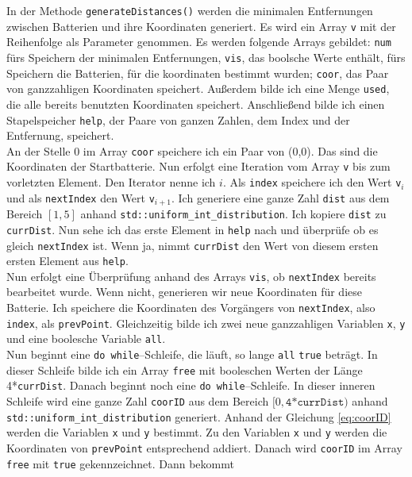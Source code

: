 \documentclass[a4paper,10pt,ngerman]{scrartcl}
\begin{document}
In der Methode \texttt{generateDistances()} werden die minimalen Entfernungen zwischen Batterien und ihre Koordinaten generiert.
Es wird ein Array \texttt{v} mit der Reihenfolge als Parameter genommen.
Es werden folgende Arrays gebildet: \texttt{num} fürs Speichern der minimalen Entfernungen, \texttt{vis}, das boolsche Werte
enthält, fürs Speichern die Batterien, für die koordinaten bestimmt wurden; \texttt{coor}, das Paar von
ganzzahligen Koordinaten speichert.
Außerdem bilde ich eine Menge \texttt{used}, die alle bereits benutzten Koordinaten speichert.
Anschließend bilde ich einen Stapelspeicher \texttt{help}, der Paare von ganzen Zahlen, dem Index und der Entfernung, speichert.\\
An der Stelle 0 im Array \texttt{coor} speichere ich ein Paar von (0,0). Das sind die Koordinaten der Startbatterie.
Nun erfolgt eine Iteration vom Array \texttt{v} bis zum vorletzten Element. Den Iterator nenne ich $i$.
Als \texttt{index} speichere ich den Wert \texttt{v}$_i$ und als \texttt{nextIndex} den Wert \texttt{v}$_{i+1}$.
Ich generiere eine ganze Zahl \texttt{dist} aus dem Bereich $[1,5]$ anhand \texttt{std::uniform\_int\_distribution}.
Ich kopiere \texttt{dist} zu \texttt{currDist}. Nun sehe ich das erste Element in \texttt{help} nach und überprüfe
ob es gleich \texttt{nextIndex} ist. Wenn ja, nimmt \texttt{currDist} den Wert von diesem ersten ersten Element aus \texttt{help}.\\
Nun erfolgt eine Überprüfung anhand des Arrays \texttt{vis}, ob \texttt{nextIndex} bereits bearbeitet wurde.
Wenn nicht, generieren wir neue Koordinaten für diese Batterie.
Ich speichere die Koordinaten des Vorgängers von \texttt{nextIndex}, also \texttt{index}, als \texttt{prevPoint}.
Gleichzeitig bilde ich zwei neue ganzzahligen Variablen
\texttt{x}, \texttt{y} und eine boolesche Variable \texttt{all}.\\
Nun beginnt eine \texttt{do while}--Schleife, die läuft, so lange \texttt{all} \texttt{true} beträgt.
In dieser Schleife bilde ich ein Array \texttt{free} mit booleschen Werten der Länge 4*\texttt{currDist}.
Danach beginnt noch eine \texttt{do while}--Schleife. In dieser inneren Schleife wird
eine ganze Zahl \texttt{coorID} aus dem Bereich $[0, \texttt{4*currDist})$ anhand \texttt{std::uniform\_int\_distribution} generiert.
Anhand der Gleichung \ref{eq:coorID} werden die Variablen \texttt{x} und \texttt{y} bestimmt.
Zu den Variablen \texttt{x} und \texttt{y} werden die Koordinaten von \texttt{prevPoint} entsprechend addiert.
Danach wird \texttt{coorID} im Array \texttt{free} mit \texttt{true} gekennzeichnet. Dann bekommt 
\end{document}
